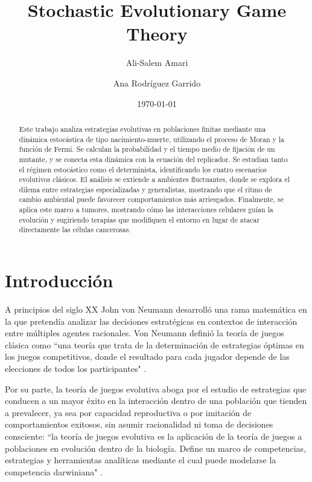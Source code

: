\documentclass[%
 sor,
 jor,
 amsmath,amssymb,
 reprint,%
]{revtex4-2}
\begin{document}

\title[Stochastic Evolutionary Game Theory]{Stochastic Evolutionary Game Theory}%

\author{Ali-Salem Amari}
\author{Ana Rodríguez Garrido}

\date{\today}%

\begin{abstract}
Este trabajo analiza estrategias evolutivas en poblaciones finitas mediante una dinámica estocástica de tipo nacimiento-muerte, utilizando el proceso de Moran y la función de Fermi. Se calculan la probabilidad y el tiempo medio de fijación de un mutante, y se conecta esta dinámica con la ecuación del replicador. Se estudian tanto el régimen estocástico como el determinista, identificando los cuatro escenarios evolutivos clásicos. El análisis se extiende a ambientes fluctuantes, donde se explora el dilema entre estrategias especializadas y generalistas, mostrando que el ritmo de cambio ambiental puede favorecer comportamientos más arriesgados. Finalmente, se aplica este marco a tumores, mostrando cómo las interacciones celulares guían la evolución y sugiriendo terapias que modifiquen el entorno en lugar de atacar directamente las células cancerosas.
\end{abstract}


\maketitle

\section{\label{sec:level1}Introducción}

A principios del siglo XX John von Neumann desarrolló una rama matemática en la que pretendía analizar las decisiones estratégicas en contextos de interacción entre múltiples agentes racionales. 
Von Neumann definió la teoría de juegos clásica como ``una teoría que trata de la determinación de estrategias óptimas en los juegos competitivos, donde el resultado para cada jugador depende de las elecciones de todos los participantes" \cite{vonNeumann1944}. 

Por su parte, la teoría de juegos evolutiva aboga por el estudio de estrategias que conducen a un mayor éxito en la interacción dentro de una población que tienden a prevalecer, ya sea por capacidad reproductiva o por imitación de comportamientos exitosos, sin asumir racionalidad ni toma de decisiones consciente: 
``la teoría de juegos evolutiva es la aplicación de la teoría de juegos a poblaciones en evolución dentro de la biología. Define un marco de competencias, estrategias y herramientas analíticas mediante el cual puede modelarse la competencia darwiniana" \cite{MaynardSmith1982}. \newline
\end{document}
